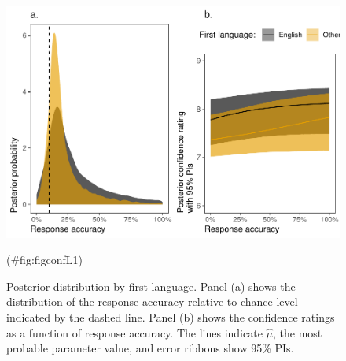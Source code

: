 \begin{appendix}
\begin{figure}[!ht]
{\centering \includegraphics{report_files/figure-latex/figconfL1-1} 

}

\caption{\label{fig:postL1}Posterior distribution by first language. Panel (a) shows the distribution of the response accuracy relative to chance-level indicated by the dashed line. Panel (b) shows the confidence ratings as a function of response accuracy. The lines indicate $\hat{\mu}$, the most probable parameter value, and error ribbons show 95\% PIs.}(\#fig:figconfL1)
\end{figure}
\end{appendix}
